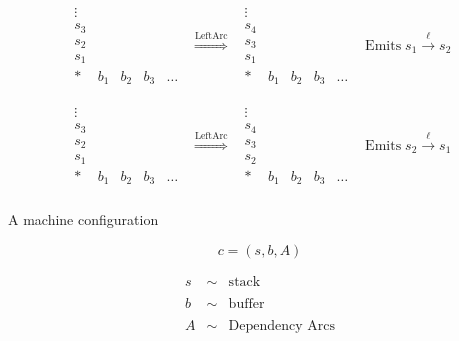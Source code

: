 {

$$\begin{array}{llll}
    \begin{array}{lllll}
      \vdots \\
      s_3 \\
    s_2 \\
    s_1 \\
    * & b_1 & b_2 & b_3 & \ldots
  \end{array}
  &
  \stackrel{\mbox{LeftArc}}{\Rightarrow}
  &
  \begin{array}{lllll}
    \vdots \\
    s_4 \\
    s_3 \\
    s_1 \\
    * & b_1 & b_2 & b_3 & \ldots
  \end{array}
  &
  \mbox{Emits} \;s_1 \stackrel{\ell}{\rightarrow} s_2 \\
  \\
  \\
    \begin{array}{lllll}
      \vdots \\
      s_3 \\
    s_2 \\
    s_1 \\
    * & b_1 & b_2 & b_3 & \ldots
  \end{array}
  &
  \stackrel{\mbox{LeftArc}}{\Rightarrow}
  &
  \begin{array}{lllll}
    \vdots \\
    s_4 \\
    s_3 \\
    s_2 \\
    * & b_1 & b_2 & b_3 & \ldots
  \end{array}
  &
  \mbox{Emits} \;s_2 \stackrel{\ell}{\rightarrow} s_1 \\
\end{array}
$$


A machine configuration

$$c = (s,b,A)$$

\begin{eqnarray*}
  s & \sim & \mbox{stack} \\
  \\
  b & \sim & \mbox{buffer} \\
  \\
  A & \sim & \mbox{Dependency Arcs}
\end{eqnarray*}

}
